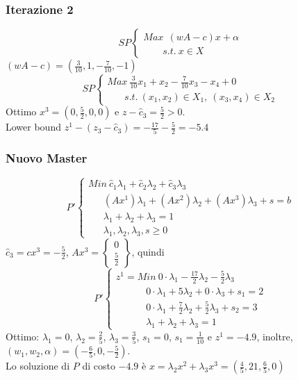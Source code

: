 \subsubsection{Iterazione 2}
\begin{equation*}
	SP
	\begin{cases}
		Max\ \ (w A-c)x+\alpha \\
		\ \ \ \ \ \ \ \ \ s.t. \ x\in X
	\end{cases}
\end{equation*}
$(w A-c)=(\frac{3}{10},1,-\frac{7}{10},-1)$
\begin{equation*}
	SP
	\begin{cases}
		Max\ \frac{3}{10}x_{1}+x_{2}-\frac{7}{10}x_{3}-x_{4}+0 \\
		\ \ \ \ \ \ \ \ s.t.\ (x_{1},x_{2})\in X_{1},\ (x_{3},x_{4})\in X_{2}
	\end{cases}
\end{equation*}
Ottimo $x^{3}=(0,\frac{5}{2},0,0)$ e $z-\hat{c}_{3}=\frac{5}{2}>0$.\\
Lower bound $z^{1}-(z_{3}-\hat{c}_{3})=-\frac{17}{5}-\frac{5}{2}=-5.4$

\subsubsection{Nuovo Master}
\begin{equation*}
	P'
	\begin{cases}
		Min\ \hat{c}_{1}\lambda_{1}+\hat{c}_{2}\lambda_{2}+\hat{c}_{3}\lambda_{3}\\
		\ \ \ \ \ \ \ (Ax^{1})\lambda_{1}+(Ax^{2})\lambda_{2}+(Ax^{3})\lambda_{3}+s=b \\
		\ \ \ \ \ \ \ \lambda_{1}+\lambda_{2}+\lambda_{3}=1 \\
		\ \ \ \ \ \ \ \lambda_{1},\lambda_{2},\lambda_{3},s\ge 0
	\end{cases}
\end{equation*}
$\hat{c}_{3}=cx^{3}=-\frac{5}{2}$, $Ax^{3}=\begin{Bmatrix}0\\\frac{5}{2}\end{Bmatrix}$, quindi
\begin{equation*}
	P'
	\begin{cases}
		z^{1}=Min\ 0\cdot\lambda_{1}-\frac{17}{2}\lambda_{2}-\frac{5}{2}\lambda_{3} \\
		\ \ \ \ \ \ \ \ \ \ \ \ \ \  0\cdot\lambda_{1}+5\lambda_{2}+0\cdot\lambda_{3}+s_{1}=2 \\
		\ \ \ \ \ \ \ \ \ \ \ \ \ \  0\cdot\lambda_{1}+\frac{7}{2}\lambda_{2}+\frac{5}{2}\lambda_{3}+s_{2}=3 \\
		\ \ \ \ \ \ \ \ \ \ \ \ \ \ \lambda_{1}+\lambda_{2}+\lambda_{3}=1
	\end{cases}
\end{equation*}
Ottimo: $\lambda_{1}=0$, $\lambda_{2}=\frac{2}{5}$, $\lambda_{3}=\frac{3}{5}$, $s_{1}=0$, $s_{1}=\frac{1}{10}$ e $z^{1}=-4.9$, inoltre, $(w_{1},w_{2},\alpha)=(-\frac{6}{5},0,-\frac{5}{2})$.\\
Lo soluzione di $P$ di costo $-4.9$ è $x=\lambda_{2}x^{2}+\lambda_{3}x^{3}=(\frac{4}{5},21,\frac{6}{5},0)$

